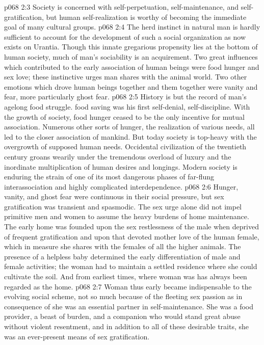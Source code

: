 \vs p068 2:3 Society is concerned with self\hyp{}perpetuation, self\hyp{}maintenance, and self\hyp{}gratification, but human self\hyp{}realization is worthy of becoming the immediate goal of many cultural groups.
\vs p068 2:4 The herd instinct in natural man is hardly sufficient to account for the development of such a social organization as now exists on Urantia. Though this innate gregarious propensity lies at the bottom of human society, much of man’s sociability is an acquirement. Two great influences which contributed to the early association of human beings were food hunger and sex love; these instinctive urges man shares with the animal world. Two other emotions which drove human beings together and  them together were vanity and fear, more particularly ghost fear.
\vs p068 2:5 \pc History is but the record of man’s agelong food struggle.  food saving was his first self\hyp{}denial, self\hyp{}discipline. With the growth of society, food hunger ceased to be the only incentive for mutual association. Numerous other sorts of hunger, the realization of various needs, all led to the closer association of mankind. But today society is top\hyp{}heavy with the overgrowth of supposed human needs. Occidental civilization of the twentieth century groans wearily under the tremendous overload of luxury and the inordinate multiplication of human desires and longings. Modern society is enduring the strain of one of its most dangerous phases of far\hyp{}flung interassociation and highly complicated interdependence.
\vs p068 2:6 Hunger, vanity, and ghost fear were continuous in their social pressure, but sex gratification was transient and spasmodic. The sex urge alone did not impel primitive men and women to assume the heavy burdens of home maintenance. The early home was founded upon the sex restlessness of the male when deprived of frequent gratification and upon that devoted mother love of the human female, which in measure she shares with the females of all the higher animals. The presence of a helpless baby determined the early differentiation of male and female activities; the woman had to maintain a settled residence where she could cultivate the soil. And from earliest times, where woman was has always been regarded as the home.
\vs p068 2:7 Woman thus early became indispensable to the evolving social scheme, not so much because of the fleeting sex passion as in consequence of  she was an essential partner in self\hyp{}maintenance. She was a food provider, a beast of burden, and a companion who would stand great abuse without violent resentment, and in addition to all of these desirable traits, she was an ever\hyp{}present means of sex gratification.
